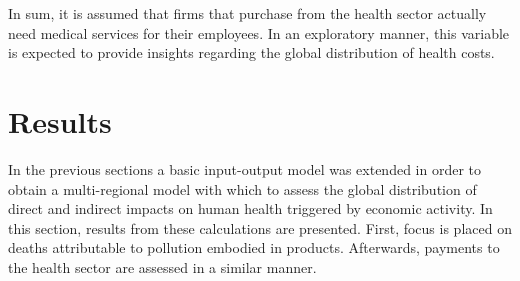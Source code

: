 \documentclass[a4paper,12pt]{article}
\begin{document}
In sum, it is assumed that firms that purchase from the health sector actually need medical services for their employees. In an exploratory manner, this variable is expected to provide insights regarding the global distribution of health costs.



\newpage
%
%
%
%
%
% 

\section{Results}
\label{sec:results}

In the previous sections a basic input-output model was extended in order to obtain a multi-regional model with which to assess the global distribution of direct and indirect impacts on human health triggered by economic activity. In this section, results from these calculations are presented. First, focus is placed on deaths attributable to pollution embodied in products. Afterwards, payments to the health sector are assessed in a similar manner. 
\end{document}

